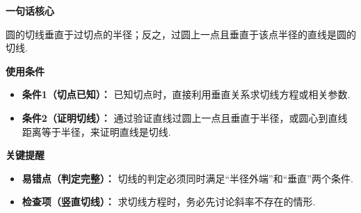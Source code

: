 \begin{summarybox}
	\textbf{\textcolor{CSummary}{一句话核心}}

	圆的切线垂直于过切点的半径；反之，过圆上一点且垂直于该点半径的直线是圆的切线.

	\medskip
	\textbf{\textcolor{CSummary}{使用条件}}
	\begin{itemize}[leftmargin=*, itemsep=0.5em, topsep=0.4em]
		\item \textbf{条件1（切点已知）：} 已知切点时，直接利用垂直关系求切线方程或相关参数.
		\item \textbf{条件2（证明切线）：} 通过验证直线过圆上一点且垂直于半径，或圆心到直线距离等于半径，来证明直线是切线.
	\end{itemize}

	\medskip
	\textbf{\textcolor{CSummary}{关键提醒}}
	\begin{itemize}[leftmargin=*, itemsep=0.5em, topsep=0.4em]
		\item \textbf{易错点（判定完整）：} 切线的判定必须同时满足“半径外端”和“垂直”两个条件.
		\item \textbf{检查项（竖直切线）：} 求切线方程时，务必先讨论斜率不存在的情形.
	\end{itemize}
\end{summarybox}
